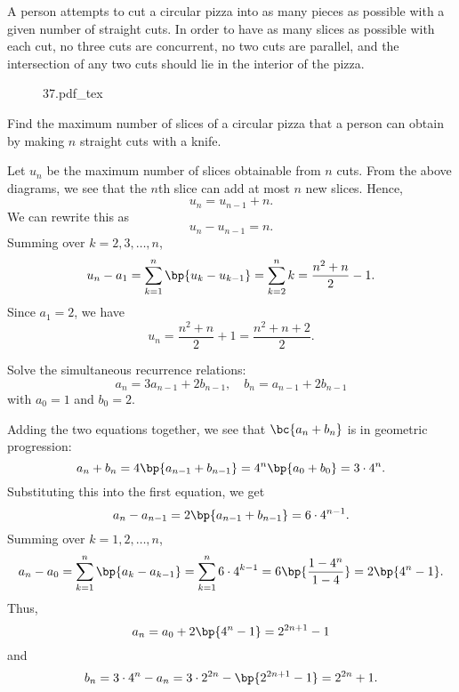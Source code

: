\begin{problem}[\chili]
    A person attempts to cut a circular pizza into as many pieces as possible with a given number of straight cuts. In order to have as many slices as possible with each cut, no three cuts are concurrent, no two cuts are parallel, and the intersection of any two cuts should lie in the interior of the pizza. 
    
    \begin{figure}[H]
        {37.pdf_tex}
    \end{figure}

    Find the maximum number of slices of a circular pizza that a person can obtain by making $n$ straight cuts with a knife.
\end{problem}
\begin{solution}
    Let $u_n$ be the maximum number of slices obtainable from $n$ cuts. From the above diagrams, we see that the $n$th slice can add at most $n$ new slices. Hence, \[u_n = u_{n-1} + n.\] We can rewrite this as \[u_n - u_{n-1} = n.\] Summing over $k = 2, 3, \dots, n$, \[u_n - a_1 = \sum_{k = 1}^n \bp{u_k - u_{k-1}} = \sum_{k = 2}^n k = \frac{n^2 + n}{2} - 1.\] Since $a_1 = 2$, we have \[u_n = \frac{n^2 + n}{2} + 1 = \frac{n^2 + n + 2}{2}.\]
\end{solution}

\begin{problem}[\chili]
    Solve the simultaneous recurrence relations: \[a_n = 3a_{n-1} + 2b_{n-1}, \quad b_n = a_{n-1} + 2b_{n-1}\] with $a_0 = 1$ and $b_0 = 2$.
\end{problem}
\begin{solution}
    Adding the two equations together, we see that $\bc{a_n + b_n}$ is in geometric progression: \[a_n + b_n = 4\bp{a_{n-1} + b_{n-1}} = 4^n \bp{a_0 + b_0} = 3 \cdot 4^n.\] Substituting this into the first equation, we get \[a_n - a_{n-1} = 2\bp{a_{n-1} + b_{n-1}} = 6 \cdot 4^{n-1}.\] Summing over $k = 1, 2, \dots, n$, \[a_n - a_0 = \sum_{k = 1}^{n} \bp{a_k - a_{k-1}} = \sum_{k = 1}^n 6 \cdot 4^{k-1} = 6 \bp{\frac{1 - 4^n}{1 - 4}} = 2\bp{4^n - 1}.\] Thus, \[a_n = a_0 + 2\bp{4^n - 1} = 2^{2n+1} - 1\] and \[b_n = 3\cdot4^n - a_n = 3\cdot 2^{2n} - \bp{2^{2n+1} - 1} = 2^{2n} + 1.\]
\end{solution}